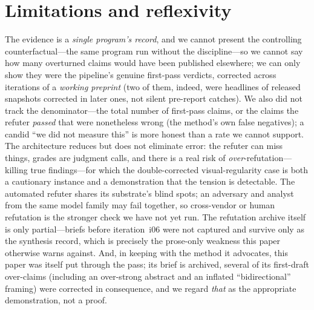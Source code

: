 \documentclass[11pt]{article}
\begin{document}
\section{Limitations and reflexivity}
The evidence is a \emph{single program's record}, and we cannot present the controlling
counterfactual---the same program run without the discipline---so we cannot say how many
overturned claims would have been published elsewhere; we can only show they were the
pipeline's genuine first-pass verdicts, corrected across iterations of a \emph{working
preprint} (two of them, indeed, were headlines of released snapshots corrected in later ones,
not silent pre-report catches). We also did not track the denominator---the total number of
first-pass claims, or the claims the refuter \emph{passed} that were nonetheless wrong (the
method's own false negatives); a candid ``we did not measure this'' is more honest than a rate
we cannot support. The architecture reduces but does not eliminate error: the refuter can miss
things, grades are judgment calls, and there is a real risk of \emph{over}-refutation---
killing true findings---for which the double-corrected visual-regularity case is both a
cautionary instance and a demonstration that the tension is detectable. The automated refuter
shares its substrate's blind spots; an adversary and analyst from the same model family may
fail together, so cross-vendor or human refutation is the stronger check we have not yet run.
The refutation archive itself is only partial---briefs before iteration~i06 were not captured
and survive only as the synthesis record, which is precisely the prose-only weakness this
paper otherwise warns against. And, in keeping with the method it advocates, this paper was
itself put through the pass; its brief is archived, several of its first-draft over-claims
(including an over-strong abstract and an inflated ``bidirectional'' framing) were corrected in
consequence, and we regard \emph{that} as the appropriate demonstration, not a proof.
\end{document}
